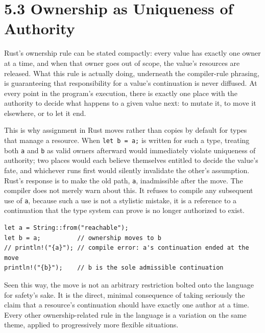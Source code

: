 \documentclass[11pt]{book}
\begin{document}
\section*{5.3 Ownership as Uniqueness of Authority}

Rust's ownership rule can be stated compactly: every value has exactly one owner at a time, and when that owner goes out of scope, the value's resources are released. What this rule is actually doing, underneath the compiler-rule phrasing, is guaranteeing that responsibility for a value's continuation is never diffused. At every point in the program's execution, there is exactly one place with the authority to decide what happens to a given value next: to mutate it, to move it elsewhere, or to let it end.

This is why assignment in Rust moves rather than copies by default for types that manage a resource. When \texttt{let b = a;} is written for such a type, treating both \texttt{a} and \texttt{b} as valid owners afterward would immediately violate uniqueness of authority; two places would each believe themselves entitled to decide the value's fate, and whichever runs first would silently invalidate the other's assumption. Rust's response is to make the old path, \texttt{a}, inadmissible after the move. The compiler does not merely warn about this. It refuses to compile any subsequent use of \texttt{a}, because such a use is not a stylistic mistake, it is a reference to a continuation that the type system can prove is no longer authorized to exist.

\begin{lstlisting}
let a = String::from("reachable");
let b = a;          // ownership moves to b
// println!("{a}"); // compile error: a's continuation ended at the move
println!("{b}");    // b is the sole admissible continuation
\end{lstlisting}

Seen this way, the move is not an arbitrary restriction bolted onto the language for safety's sake. It is the direct, minimal consequence of taking seriously the claim that a resource's continuation should have exactly one author at a time. Every other ownership-related rule in the language is a variation on the same theme, applied to progressively more flexible situations.
\end{document}
